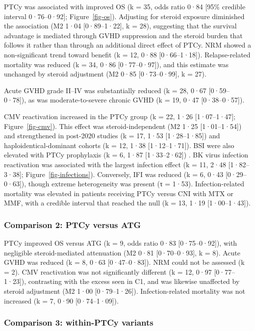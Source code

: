 \documentclass[
  british,
  8.6pt,
  a4paper,
  twocolumn]{article}
\begin{document}
PTCy was associated with improved OS (k = 35, odds ratio 0·84 {[}95\%
credible interval 0·76--0·92{]}; Figure~\ref{fig-os}). Adjusting for
steroid exposure diminished the association (M2 1·04 {[}0·89--1·22{]}, k
= 28), suggesting that the survival advantage is mediated through GVHD
suppression and the steroid burden that follows it rather than through
an additional direct effect of PTCy. NRM showed a non-significant trend
toward benefit (k = 12, 0·88 {[}0·66--1·18{]}). Relapse-related
mortality was reduced (k = 34, 0·86 {[}0·77--0·97{]}), and this estimate
was unchanged by steroid adjustment (M2 0·85 {[}0·73--0·99{]}, k = 27).

Acute GVHD grade II--IV was substantially reduced (k = 28, 0·67
{[}0·59--0·78{]}), as was moderate-to-severe chronic GVHD (k = 19, 0·47
{[}0·38--0·57{]}).

CMV reactivation increased in the PTCy group (k = 22, 1·26
{[}1·07--1·47{]}; Figure~\ref{fig-cmv}). This effect was
steroid-independent (M2 1·25 {[}1·01--1·54{]}) and strengthened in
post-2020 studies (k = 17, 1·53 {[}1·28--1·85{]}) and
haploidentical-dominant cohorts (k = 12, 1·38 {[}1·12--1·71{]}). BSI
were also elevated with PTCy prophylaxis (k = 6, 1·87 {[}1·33--2·62{]})
. BK virus infection reactivation was associated with the largest
infection effect (k = 11, 2·48 {[}1·82--3·38{]};
Figure~\ref{fig-infections}). Conversely, IFI was reduced (k = 6, 0·43
{[}0·29--0·63{]}), though extreme heterogeneity was present (τ = 1·53).
Infection-related mortality was elevated in patients receiving PTCy
versus CNI with MTX or MMF, with a credible interval that reached the
null (k = 13, 1·19 {[}1·00--1·43{]}).

\subsubsection{Comparison 2: PTCy versus
ATG}\label{comparison-2-ptcy-versus-atg}

PTCy improved OS versus ATG (k = 9, odds ratio 0·83 {[}0·75--0·92{]}),
with negligible steroid-mediated attenuation (M2 0·81 {[}0·70--0·93{]},
k = 8). Acute GVHD was reduced (k = 8, 0·63 {[}0·47--0·83{]}). NRM could
not be assessed (k = 2). CMV reactivation was not significantly
different (k = 12, 0·97 {[}0·77--1·23{]}), contrasting with the excess
seen in C1, and was likewise unaffected by steroid adjustment (M2 1·00
{[}0·79--1·26{]}). Infection-related mortality was not increased (k = 7,
0·90 {[}0·74--1·09{]}).

\subsubsection{Comparison 3: within-PTCy
variants}\label{comparison-3-within-ptcy-variants}
\end{document}
